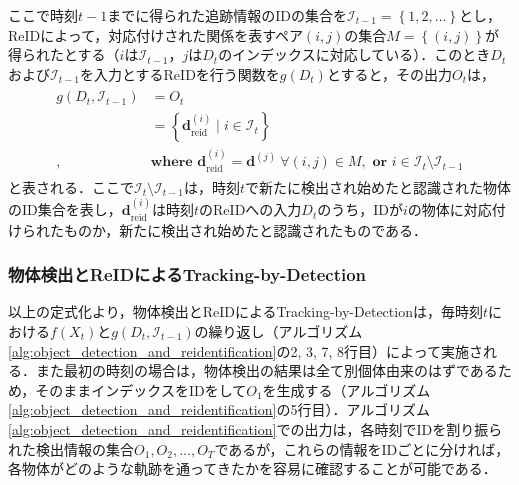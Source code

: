         ここで時刻$t-1$までに得られた追跡情報のIDの集合を$\mathcal{I}_{t-1} = \left\{1, 2, \dots\right\}$とし，ReIDによって，対応付けされた関係を表すペア$(i, j)$の集合$M = \left\{(i, j)\right\}$が得られたとする（$i$は$\mathcal{I}_{t-1}$，$j$は$D_t$のインデックスに対応している）．このとき$D_t$および$\mathcal{I}_{t-1}$を入力とするReIDを行う関数を$g(D_t)$とすると，その出力$O_t$は，
        \begin{eqnarray}
            \label{eq:output_of_reid}
            \begin{aligned}
                g(D_t, \mathcal{I}_{t-1}) &= O_t
                \\ &= \left\{\bm{d}_{\text{reid}}^{(i)} \mid i \in \mathcal{I}_t\right\}
                \\, &\textbf{where } \bm{d}_{\text{reid}}^{(i)} = \bm{d}^{(j)} ~ \forall (i, j) \in M, \textbf{ or } i \in \mathcal{I}_t \setminus \mathcal{I}_{t-1}
            \end{aligned}
        \end{eqnarray}
        と表される．ここで$\mathcal{I}_t \setminus \mathcal{I}_{t-1}$は，時刻$t$で新たに検出され始めたと認識された物体のID集合を表し，$\bm{d}_{\text{reid}}^{(i)}$は時刻$t$のReIDへの入力$D_t$のうち，IDが$i$の物体に対応付けられたものか，新たに検出され始めたと認識されたものである．

        \subsubsection{物体検出とReIDによるTracking-by-Detection}
        以上の定式化より，物体検出とReIDによるTracking-by-Detectionは，毎時刻$t$における$f(X_t)$と$g(D_t, \mathcal{I}_{t-1})$の繰り返し（アルゴリズム\ref{alg:object_detection_and_reidentification}の2, 3, 7, 8行目）によって実施される．また最初の時刻の場合は，物体検出の結果は全て別個体由来のはずであるため，そのままインデックスをIDをして$O_1$を生成する（アルゴリズム\ref{alg:object_detection_and_reidentification}の5行目）．アルゴリズム\ref{alg:object_detection_and_reidentification}での出力は，各時刻でIDを割り振られた検出情報の集合$O_1, O_2, \dots, O_T$であるが，これらの情報をIDごとに分ければ，各物体がどのような軌跡を通ってきたかを容易に確認することが可能である．

